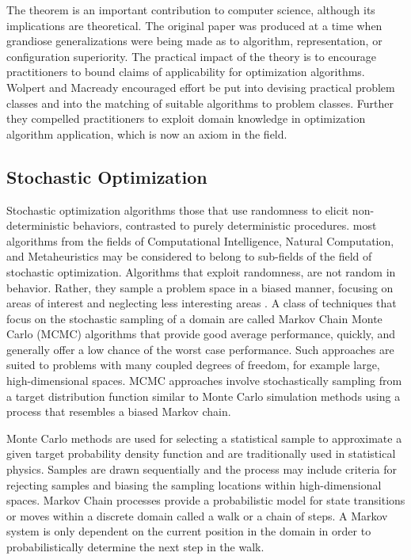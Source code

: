 The theorem is an important contribution to computer science, although its implications are theoretical. The original paper was produced at a time when grandiose generalizations were being made as to algorithm, representation, or configuration superiority. The practical impact of the theory is to encourage practitioners to bound claims of applicability for optimization algorithms. Wolpert and Macready encouraged effort be put into devising practical problem classes and into the matching of suitable algorithms to problem classes. Further they compelled practitioners to exploit domain knowledge in optimization algorithm application, which is now an axiom in the field.

% 
% 
\subsection{Stochastic Optimization}
\label{subsec:stochastic}
Stochastic optimization algorithms those that use randomness to elicit non-deterministic behaviors, contrasted to purely deterministic procedures. 
most algorithms from the fields of Computational Intelligence, Natural Computation, and Metaheuristics may be considered to belong to sub-fields of the field of stochastic optimization. Algorithms that exploit randomness, are not random in behavior. Rather, they sample a problem space in a biased manner, focusing on areas of interest and neglecting less interesting areas \cite{Spall2003}. 
A class of techniques that focus on the stochastic sampling of a domain are called Markov Chain Monte Carlo (MCMC) algorithms that provide good average performance, quickly, and generally offer a low chance of the worst case performance. Such approaches are suited to problems with many coupled degrees of freedom, for example large, high-dimensional spaces. MCMC approaches involve stochastically sampling from a target distribution function similar to Monte Carlo simulation methods using a process that resembles a biased Markov chain.

Monte Carlo methods are used for selecting a statistical sample to approximate a given target probability density function and are traditionally used in statistical physics. Samples are drawn sequentially and the process may include criteria for rejecting samples and biasing the sampling locations within high-dimensional spaces. 
Markov Chain processes provide a probabilistic model for state transitions or moves within a discrete domain called a walk or a chain of steps. A Markov system is only dependent on the current position in the domain in order to probabilistically determine the next step in the walk. 

